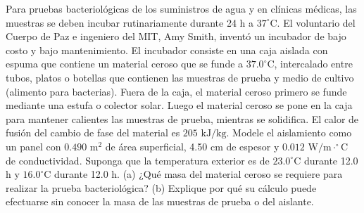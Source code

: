 \item Para pruebas bacteriológicas de los suministros de agua y en clínicas médicas, las muestras se deben incubar rutinariamente durante 24 h a $37^\circ\text{C}$. El voluntario del Cuerpo de Paz e ingeniero del MIT, Amy Smith, inventó un incubador de bajo costo y bajo mantenimiento. El incubador consiste en una caja aislada con espuma que contiene un material ceroso que se funde a $37.0^\circ\text{C}$, intercalado entre tubos, platos o botellas que contienen las muestras de prueba y medio de cultivo (alimento para bacterias). Fuera de la caja, el material ceroso primero se funde mediante una estufa o colector solar. Luego el material ceroso se pone en la caja para mantener calientes las muestras de prueba, mientras se solidifica. El calor de fusión del cambio de fase del material es $205\text{ kJ/kg}$. Modele el aislamiento como un panel con $0.490\text{ m}^2$ de área superficial, 4.50 cm de espesor y $0.012\text{ W/m}\cdot^\circ\text{C}$ de conductividad. Suponga que la temperatura exterior es de $23.0^\circ\text{C}$ durante 12.0 h y $16.0^\circ\text{C}$ durante 12.0 h. (a) ¿Qué masa del material ceroso se requiere para realizar la prueba bacteriológica? (b) Explique por qué su cálculo puede efectuarse sin conocer la masa de las muestras de prueba o del aislante.
